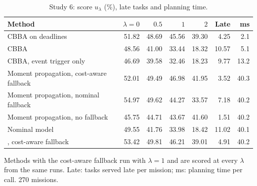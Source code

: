 \begin{table}[t]
\caption{Study 6: score $u_\lambda$ (\%), late tasks and planning time.}\label{tab:s6}
\centering\small
\begin{threeparttable}
\begin{tabular}{lrrrrrr}
\toprule
Method & $\lambda=0$ & $0.5$ & $1$ & $2$ & Late & ms \\
\midrule
CBBA on \mname{} deadlines & 51.82 & 48.69 & 45.56 & 39.30 & 4.25 & 2.1 \\
CBBA & 48.56 & 41.00 & 33.44 & 18.32 & 10.57 & 5.1 \\
CBBA, event trigger only & 46.69 & 39.58 & 32.46 & 18.23 & 9.77 & 13.2 \\
Moment propagation, cost-aware fallback & 52.01 & 49.49 & 46.98 & 41.95 & 3.52 & 40.3 \\
Moment propagation, nominal fallback & 54.97 & 49.62 & 44.27 & 33.57 & 7.18 & 40.2 \\
Moment propagation, no fallback & 45.75 & 44.71 & 43.67 & 41.60 & 1.51 & 40.2 \\
Nominal model & 49.55 & 41.76 & 33.98 & 18.42 & 11.02 & 40.1 \\
\mname{}, cost-aware fallback & 53.42 & 49.81 & 46.21 & 39.01 & 4.91 & 40.2 \\
\bottomrule
\end{tabular}
\begin{tablenotes}[flushleft]\scriptsize
\item[] Methods with the cost-aware fallback run with $\lambda=1$ and are scored at every $\lambda$ from the same runs. Late: tasks served late per mission; ms: planning time per call. 270 missions.
\end{tablenotes}
\end{threeparttable}
\end{table}
